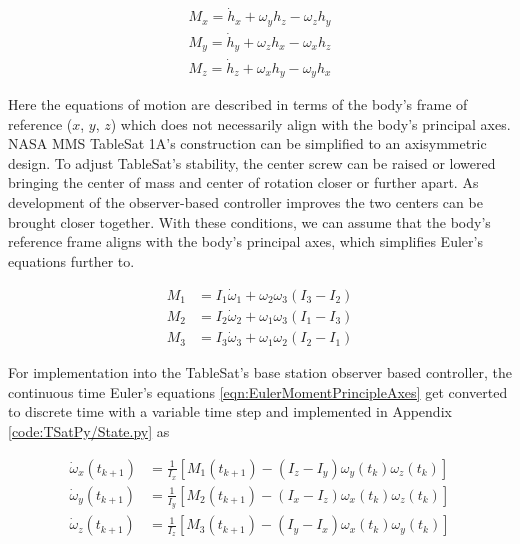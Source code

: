 \begin{subequations}
  \begin{align}
    M_x = \dot{h}_x + \omega_y h_z - \omega_z h_y \\
    M_y = \dot{h}_y + \omega_z h_x - \omega_x h_z \\
    M_z = \dot{h}_z + \omega_x h_y - \omega_y h_x
  \end{align}
  \label{eqn:EulerMoment}
\end{subequations}

Here the equations of motion are described in terms of the body's frame of reference ($x$, $y$, $z$) which does not necessarily align with the body's principal axes.  NASA MMS TableSat 1A's construction can be simplified to an axisymmetric design.  To adjust TableSat's stability, the center screw can be raised or lowered bringing the center of mass and center of rotation closer or further apart.  As development of the observer-based controller improves the two centers can be brought closer together.  With these conditions, we can assume that the body's reference frame aligns with the body's principal axes, which simplifies Euler's equations further to.

\begin{subequations}
  \begin{align}
    M_1 & = I_1 \dot{\omega}_1 + \omega_2 \omega_3 (I_3 - I_2) \\
    M_2 & = I_2 \dot{\omega}_2 + \omega_1 \omega_3 (I_1 - I_3) \\
    M_3 & = I_3 \dot{\omega}_3 + \omega_1 \omega_2 (I_2 - I_1)
  \end{align}
  \label{eqn:EulerMomentPrincipleAxes}
\end{subequations}

For implementation into the TableSat's base station observer based controller, the continuous time Euler's equations \ref{eqn:EulerMomentPrincipleAxes} get converted to discrete time with a variable time step and implemented in Appendix \ref{code:TSatPy/State.py} as

\begin{subequations}
  \begin{align}
    \dot{\omega}_{x}(t_{k+1}) & = \frac{1}{I_x} \left[ M_1(t_{k+1}) - (I_z - I_y) \omega_{y}(t_k) \omega_{z}(t_k) \right] \\
    \dot{\omega}_{y}(t_{k+1}) & = \frac{1}{I_y} \left[ M_2(t_{k+1}) - (I_x - I_z) \omega_{x}(t_k) \omega_{z}(t_k) \right] \\
    \dot{\omega}_{z}(t_{k+1}) & = \frac{1}{I_z} \left[ M_3(t_{k+1}) - (I_y - I_x) \omega_{x}(t_k) \omega_{y}(t_k) \right]
  \end{align}
  \label{eqn:DiscreteEulerMomentEquations}
\end{subequations}

